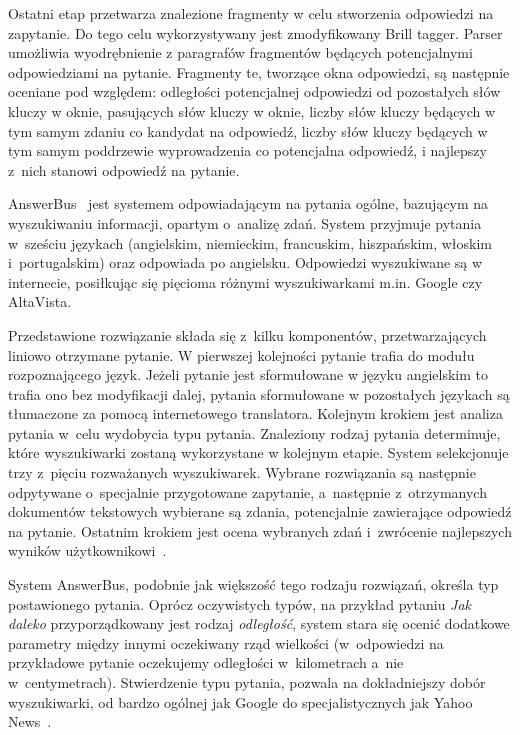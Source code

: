 Ostatni etap przetwarza znalezione fragmenty w celu stworzenia odpowiedzi na zapytanie. Do tego celu wykorzystywany jest zmodyfikowany Brill tagger. Parser umożliwia wyodrębnienie z paragrafów fragmentów będących potencjalnymi odpowiedziami na pytanie. Fragmenty te, tworzące okna odpowiedzi, są następnie oceniane pod względem:  odległości potencjalnej odpowiedzi od pozostałych słów kluczy w oknie, pasujących słów kluczy w oknie, liczby słów kluczy będących w tym samym zdaniu co kandydat na odpowiedź, liczby słów kluczy będących w tym samym poddrzewie wyprowadzenia co potencjalna odpowiedź, i najlepszy z~nich stanowi odpowiedź na pytanie\cite{moldovan-etal-2000-structure}.

AnswerBus~\cite{zheng2002answerbus} jest systemem odpowiadającym na pytania ogólne, bazującym na wyszukiwaniu informacji, opartym o~analizę zdań. System przyjmuje pytania w~sześciu językach (angielskim, niemieckim, francuskim, hiszpańskim, włoskim i~portugalskim) oraz odpowiada po angielsku. Odpowiedzi wyszukiwane są w~ internecie, posiłkując się pięcioma różnymi wyszukiwarkami m.in. Google czy AltaVista.

Przedstawione rozwiązanie składa się z~kilku komponentów, przetwarzających liniowo otrzymane pytanie. W pierwszej kolejności pytanie trafia do modułu rozpoznającego język. Jeżeli pytanie jest sformułowane w języku angielskim to trafia ono bez modyfikacji dalej, pytania sformułowane w pozostałych językach są tłumaczone za pomocą internetowego translatora. Kolejnym krokiem jest analiza pytania w~celu wydobycia typu pytania. Znaleziony rodzaj pytania determinuje, które wyszukiwarki zostaną wykorzystane w kolejnym etapie. System selekcjonuje trzy z~pięciu rozważanych wyszukiwarek. Wybrane rozwiązania są następnie odpytywane o~specjalnie przygotowane zapytanie, a~następnie z~otrzymanych dokumentów tekstowych wybierane są zdania, potencjalnie zawierające odpowiedź na pytanie. Ostatnim krokiem jest ocena wybranych zdań i~zwrócenie najlepszych wyników użytkownikowi~\cite{zheng2002answerbus}.  

System AnswerBus, podobnie jak większość tego rodzaju rozwiązań, określa typ postawionego pytania. Oprócz oczywistych typów, na przykład pytaniu \emph{Jak daleko} przyporządkowany jest rodzaj \emph{odległość}, system stara się ocenić dodatkowe parametry między innymi oczekiwany rząd wielkości (w~odpowiedzi na przykładowe pytanie oczekujemy odległości w~kilometrach a~nie w~centymetrach). Stwierdzenie typu pytania, pozwala na dokładniejszy dobór wyszukiwarki, od bardzo ogólnej jak Google do specjalistycznych jak Yahoo News~\cite{zheng2002answerbus}.


